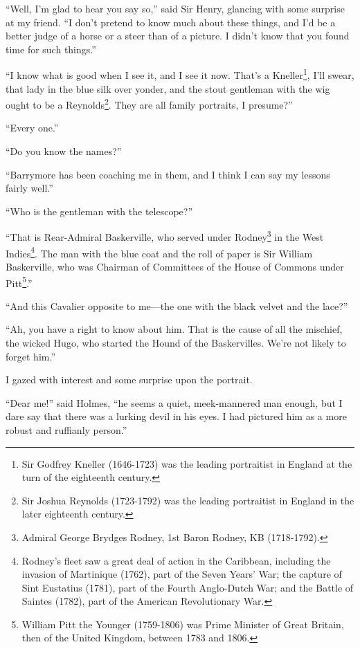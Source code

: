 \documentclass[paper=5.5in:8.5in,BCOR=7mm,twoside,DIV=calc,12pt,usegeometry,openany,chapterprefix,endperiod,headings=big]{scrbook} %
\begin{document}
\enquote{Well, I'm glad to hear you say so,} said Sir Henry, glancing with some surprise at my friend. \enquote{I don't pretend to know much about these things, and I'd be a better judge of a horse or a steer than of a picture. I didn't know that you found time for such things.}

\enquote{I know what is good when I see it, and I see it now. That's a Kneller\footnote{Sir Godfrey Kneller (1646-1723) was the leading portraitist in England at the turn of the eighteenth century.}, I'll swear, that lady in the blue silk over yonder, and the stout gentleman with the wig ought to be a Reynolds\footnote{Sir Joshua Reynolds (1723-1792) was the leading portraitist in England in the later eighteenth century.}. They are all family portraits, I presume?}

\enquote{Every one.}

\enquote{Do you know the names?}

\enquote{Barrymore has been coaching me in them, and I think I can say my lessons fairly well.}

\enquote{Who is the gentleman with the telescope?}

\enquote{That is Rear-Admiral Baskerville, who served under Rodney\footnote{Admiral George Brydges Rodney, 1st Baron Rodney, KB (1718-1792).} in the West Indies\footnote{Rodney's fleet saw a great deal of action in the Caribbean, including the invasion of Martinique (1762), part of the Seven Years' War; the capture of Sint Eustatius (1781), part of the Fourth Anglo-Dutch War; and the Battle of Saintes (1782), part of the American Revolutionary War.}. The man with the blue coat and the roll of paper is Sir William Baskerville, who was Chairman of Committees of the House of Commons under Pitt\footnote{William Pitt the Younger (1759-1806) was Prime Minister of Great Britain, then of the United Kingdom, between 1783 and 1806.}.}

\enquote{And this Cavalier opposite to me---the one with the black velvet and the lace?}

\enquote{Ah, you have a right to know about him. That is the cause of all the mischief, the wicked Hugo, who started the Hound of the Baskervilles. We're not likely to forget him.}

I gazed with interest and some surprise upon the portrait.

\enquote{Dear me!} said Holmes, \enquote{he seems a quiet, meek-mannered man enough, but I dare say that there was a lurking devil in his eyes. I had pictured him as a more robust and ruffianly person.}
\end{document}
